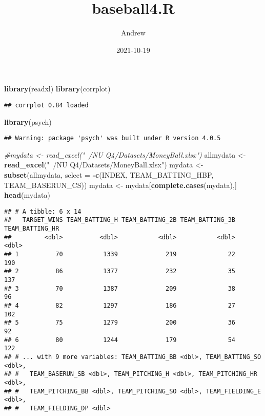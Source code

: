 \documentclass[
]{article}
\title{baseball4.R}
\author{Andrew}
\date{2021-10-19}
\newenvironment{Shaded}{\begin{snugshade}}{\end{snugshade}}
\newcommand{\CommentTok}[1]{\textcolor[rgb]{0.56,0.35,0.01}{\textit{#1}}}
\newcommand{\DataTypeTok}[1]{\textcolor[rgb]{0.13,0.29,0.53}{#1}}
\newcommand{\KeywordTok}[1]{\textcolor[rgb]{0.13,0.29,0.53}{\textbf{#1}}}
\newcommand{\NormalTok}[1]{#1}
\newcommand{\OperatorTok}[1]{\textcolor[rgb]{0.81,0.36,0.00}{\textbf{#1}}}
\newcommand{\StringTok}[1]{\textcolor[rgb]{0.31,0.60,0.02}{#1}}
\begin{document}
\maketitle

\begin{Shaded}
\begin{Highlighting}[]
\KeywordTok{library}\NormalTok{(readxl)}
\KeywordTok{library}\NormalTok{(corrplot)}
\end{Highlighting}
\end{Shaded}

\begin{verbatim}
## corrplot 0.84 loaded
\end{verbatim}

\begin{Shaded}
\begin{Highlighting}[]
\KeywordTok{library}\NormalTok{(psych)}
\end{Highlighting}
\end{Shaded}

\begin{verbatim}
## Warning: package 'psych' was built under R version 4.0.5
\end{verbatim}

\begin{Shaded}
\begin{Highlighting}[]
\CommentTok{#mydata <- read_excel("~/NU Q4/Datasets/MoneyBall.xlsx")}
\NormalTok{allmydata <-}\StringTok{ }\KeywordTok{read_excel}\NormalTok{(}\StringTok{"~/NU Q4/Datasets/MoneyBall.xlsx"}\NormalTok{)}
\NormalTok{mydata <-}\StringTok{ }\KeywordTok{subset}\NormalTok{(allmydata, }\DataTypeTok{select =} \OperatorTok{-}\KeywordTok{c}\NormalTok{(INDEX, TEAM_BATTING_HBP, TEAM_BASERUN_CS))}
\NormalTok{mydata <-}\StringTok{ }\NormalTok{mydata[}\KeywordTok{complete.cases}\NormalTok{(mydata),]}
\KeywordTok{head}\NormalTok{(mydata)}
\end{Highlighting}
\end{Shaded}

\begin{verbatim}
## # A tibble: 6 x 14
##   TARGET_WINS TEAM_BATTING_H TEAM_BATTING_2B TEAM_BATTING_3B TEAM_BATTING_HR
##         <dbl>          <dbl>           <dbl>           <dbl>           <dbl>
## 1          70           1339             219              22             190
## 2          86           1377             232              35             137
## 3          70           1387             209              38              96
## 4          82           1297             186              27             102
## 5          75           1279             200              36              92
## 6          80           1244             179              54             122
## # ... with 9 more variables: TEAM_BATTING_BB <dbl>, TEAM_BATTING_SO <dbl>,
## #   TEAM_BASERUN_SB <dbl>, TEAM_PITCHING_H <dbl>, TEAM_PITCHING_HR <dbl>,
## #   TEAM_PITCHING_BB <dbl>, TEAM_PITCHING_SO <dbl>, TEAM_FIELDING_E <dbl>,
## #   TEAM_FIELDING_DP <dbl>
\end{verbatim}
\end{document}
